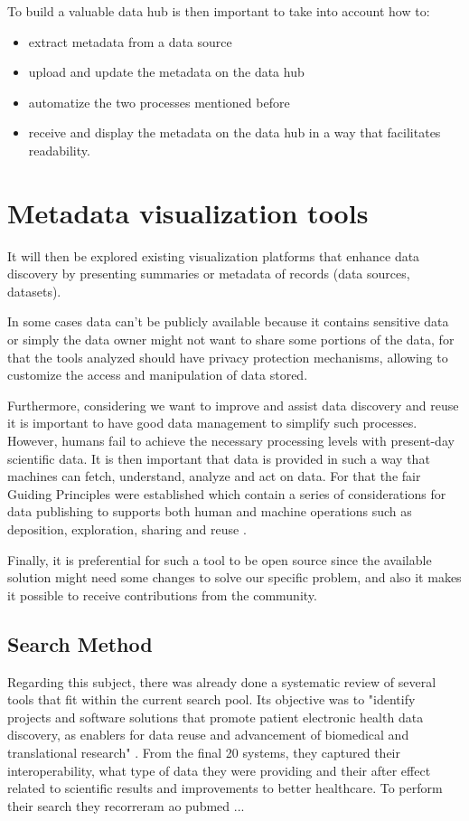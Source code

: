 To build a valuable data hub is then important to take into account how to:
\begin{itemize}
    \item extract metadata from a data source
    \item upload and update the metadata on the data hub
    \item automatize the two processes mentioned before
    \item receive and display the metadata on the data hub in a way that facilitates
        readability.
\end{itemize}

\section{Metadata visualization tools}
It will then be explored existing visualization platforms that enhance data discovery
by presenting summaries or metadata of records (data sources, datasets).

In some cases data can't be publicly available because it contains sensitive data or
simply the data owner might not want to share some portions of the data, for that the
tools analyzed should have privacy protection mechanisms, allowing to customize the
access and manipulation of data stored.

Furthermore, considering we want to improve and assist data discovery and reuse it is
important to have good data management to simplify such processes.
However, humans fail to achieve the necessary processing levels with present-day
scientific data.
It is then important that data is provided in such a way that machines can fetch,
understand, analyze and act on data.
For that the \gls{fair} Guiding Principles were established which contain a series of
considerations for data publishing to supports both human and machine operations such
as deposition, exploration, sharing and reuse \cite{fair}.

Finally, it is preferential for such a tool to be open source since the available
solution might need some changes to solve our specific problem, and also it makes it
possible to receive contributions from the community.

\subsection{Search Method}

Regarding this subject, there was already done a systematic review of several tools
that fit within the current search pool.
Its objective was to "identify projects and software solutions that promote patient
electronic health data discovery, as enablers for data reuse and advancement of
biomedical and translational research" \cite{systematic_review}.
From the final 20 systems, they captured their interoperability, what type of data they
were providing and their after effect related to scientific results and improvements to
better healthcare.
To perform their search they recorreram ao pubmed ...

